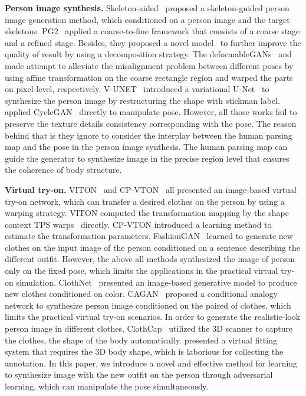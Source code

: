 \documentclass[10pt,twocolumn,letterpaper]{article}
\begin{document}
\textbf{Person image synthesis.}
Skeleton-aided~\cite{yan2017skeleton} proposed a skeleton-guided person image generation method, which conditioned on a person image and the target skeletons. PG2~\cite{ma2017pose} applied a coarse-to-fine framework that consists of a coarse stage and a refined stage. Besides, they proposed a novel model~\cite{ma2017disentangled} to further improve the quality of result by using a decomposition strategy. The deformableGANs~\cite{siarohin2017deformable} and \cite{balakrishnan2018synthesizing} made attempt to alleviate the misalignment problem between different poses by using affine transformation on the coarse rectangle region and warped the parts on pixel-level, respectively. V-UNET~\cite{Esser2018vunet} introduced a variational U-Net~\cite{ronn2015unet} to synthesize the person image by restructuring the shape with stickman label. \cite{pumarola2018unsupervised} applied CycleGAN~\cite{zhu2017cycleGAN} directly to manipulate pose. However, all those works fail to preserve the texture details consistency corresponding with the pose. The reason behind that is they ignore to consider the interplay between the human parsing map and the pose in the person image synthesis. The human parsing map can guide the generator to synthesize image in the precise region level that ensures the coherence of body structure.


\textbf{Virtual try-on.}
VITON~\cite{han2017viton} and  CP-VTON~\cite{wang2018cpvton} all presented an image-based virtual try-on network, which can transfer a desired clothes on the person by using a warping strategy. VITON computed the transformation mapping by the shape context TPS warps~\cite{belongie2002shape} directly. CP-VTON introduced a learning method to estimate the transformation parameters. FashionGAN~\cite{zhu2017fashionGAN} learned to generate new clothes on the input image of the person conditioned on a sentence describing the different outfit. However, the above all methods synthesized the image of person only on the fixed pose, which limits the applications in the practical virtual try-on simulation. ClothNet~\cite{lassner2017generative} presented an image-based generative model to produce new clothes conditioned on color. CAGAN~\cite{jetchev2017conditional} proposed a conditional analogy network to synthesize person image conditioned on the paired of clothes, which limits the practical virtual try-on scenarios. In order to generate the realistic-look person image in different clothes, ClothCap~\cite{pons2017clothcap} utilized the 3D scanner to capture the clothes, the shape of the body automatically. \cite{sekine2014virtual} presented a virtual fitting system that requires the 3D body shape, which is laborious for collecting the annotation. In this paper, we introduce a novel and effective method for learning to synthesize image with the new outfit on the person through adversarial learning, which can manipulate the pose simultaneously.
\end{document}
